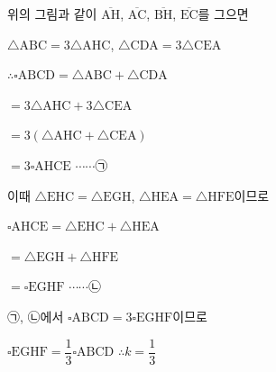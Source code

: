 위의 그림과 같이 $\overline{\mathrm{AH}}$, $\overline{\mathrm{AC}}$, $\overline{\mathrm{BH}}$, $\overline{\mathrm{EC}}$를 그으면

$\triangle\mathrm{ABC} = 3\triangle\mathrm{AHC}$, $\triangle\mathrm{CDA} = 3\triangle\mathrm{CEA}$

$\therefore \square\mathrm{ABCD} = \triangle\mathrm{ABC} + \triangle\mathrm{CDA}$

$= 3\triangle\mathrm{AHC} + 3\triangle\mathrm{CEA}$

$= 3(\triangle\mathrm{AHC} + \triangle\mathrm{CEA})$

$= 3\square\mathrm{AHCE}$ $\cdots\cdots\mbox{㉠}$

이때 $\triangle\mathrm{EHC} = \triangle\mathrm{EGH}$, $\triangle\mathrm{HEA} = \triangle\mathrm{HFE}$이므로

$\square\mathrm{AHCE} = \triangle\mathrm{EHC} + \triangle\mathrm{HEA}$

$= \triangle\mathrm{EGH} + \triangle\mathrm{HFE}$

$= \square\mathrm{EGHF}$ $\cdots\cdots\mbox{㉡}$

㉠, ㉡에서 $\square\mathrm{ABCD} = 3\square\mathrm{EGHF}$이므로

$\square\mathrm{EGHF} = \dfrac{1}{3}\square\mathrm{ABCD}$ $\therefore k = \dfrac{1}{3}$
